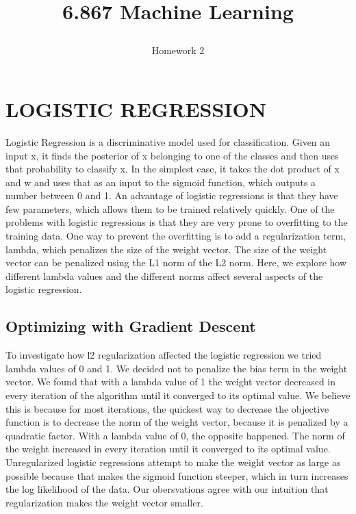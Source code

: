 \documentclass[10pt,twoside]{article}
\begin{document}
\title{6.867 Machine Learning  \subtitle{Homework 2} }

\maketitle


\section{\uppercase{Logistic Regression}}

\noindent Logistic Regression is a discriminative model used for classification. Given an input x, it finds the posterior of x belonging to one of the classes and then uses that probability to classify x. In the simplest case, it takes the dot product of x and w and uses that as an input to the sigmoid function, which outputs a number between 0 and 1. An advantage of logistic regressions is that they have few parameters, which allows them to be trained relatively quickly. One of the problems with logistic regressions is that they are very prone to overfitting to the training data. One way to prevent the overfitting is to add a regularization term, lambda, which penalizes the size of the weight vector. The size of the weight vector can be penalized using the L1 norm of the L2 norm. Here, we explore how different lambda values and the different norms affect several aspects of the logistic regression.

\subsection{Optimizing with Gradient Descent}

\noindent To investigate how l2 regularization affected the logistic regression we tried lambda values of 0 and 1. We decided not to penalize the bias term in the weight vector. We found that with a lambda value of 1 the weight vector decreased in every iteration of the algorithm until it converged to its optimal value. We believe this is because for most iterations, the quickest way to decrease the objective function is to decrease the norm of the weight vector, because it is penalized by a quadratic factor. With a lambda value of 0, the opposite happened. The norm of the weight increased in every iteration until it converged to its optimal value. Unregularized logistic regressions attempt to make the weight vector as large as possible because that makes the sigmoid function steeper, which in turn increases the log likelihood of the data. Our obersvations agree with our intuition that regularization makes the weight vector smaller.
\end{document}
